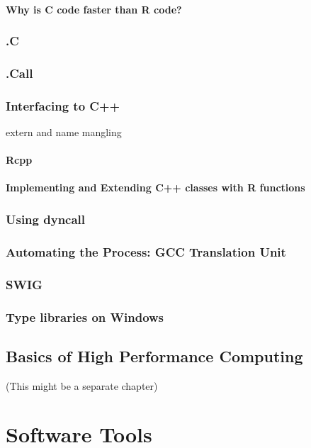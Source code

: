 \documentclass[11pt]{book}
\begin{document}
  \subsubsection{Why is C code faster than R code?}
  \subsection{.C}
  \subsection{.Call}

  \subsection{Interfacing to C++}  
     extern and name mangling
   \subsubsection{Rcpp}
   \subsubsection{Implementing and Extending C++ classes with R functions}
  \subsection{Using dyncall}
  \subsection{Automating the Process: GCC Translation Unit}
  \subsection{SWIG}
  \subsection{Type libraries on Windows}


 \section{Basics of High Performance Computing}
   (This might be a separate chapter)





\chapter{Software Tools}
\end{document}

